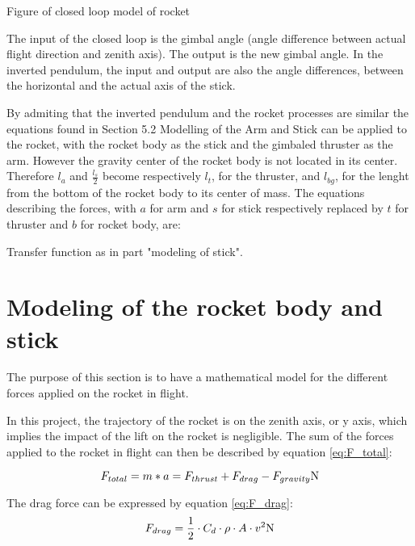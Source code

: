 			Figure of closed loop model of rocket
			
			The input of the closed loop is the gimbal angle (angle difference between actual flight direction and zenith axis). The output is the new gimbal angle. In the inverted pendulum, the input and output are also the angle differences, between the horizontal and the actual axis of the stick. 
			
			By admiting that the inverted pendulum and the rocket processes are similar the equations found in Section 5.2 Modelling of the Arm and Stick can be applied to the rocket, with the rocket body as the stick and the gimbaled thruster as the arm. However the gravity center of the rocket body is not located in its center. Therefore $l_{a}$ and $\frac{l_{s}}{2}$ become respectively $l_{t}$, for the thruster, and $l_{bg}$, for the lenght from the bottom of the rocket body to its center of mass. The equations describing the forces, with $a$ for arm and $s$ for stick respectively replaced by $t$ for thruster and $b$ for rocket body, are:
			
			Transfer function as in part "modeling of stick".
		
		\section{Modeling of the rocket body and stick}
			
		The purpose of this section is to have a mathematical model for the different forces applied on the rocket in flight. 
		
		In this project, the trajectory of the rocket is on the zenith axis, or y axis, which implies the impact of the lift on the rocket is negligible. The sum of the forces applied to the rocket in flight can then be described by equation \eqref{eq:F_total}:
		
		\begin{equation}
		F_{total} = m*a = F_{thrust} + F_{drag} - F_{gravity} \si{\newton} \label{eq:F_{total}}
		\end{equation}
		\startexplain
		\stopexplain
		
		The drag force can be expressed by equation \eqref{eq:F_drag}:
		\begin{equation}
		F_{drag} = \frac{1}{2} \cdot C_{d} \cdot \rho \cdot A \cdot v^2 \si{\newton} \label{eq:F_{drag}}
		\end{equation}
		\startexplain
		\stopexplain
			
